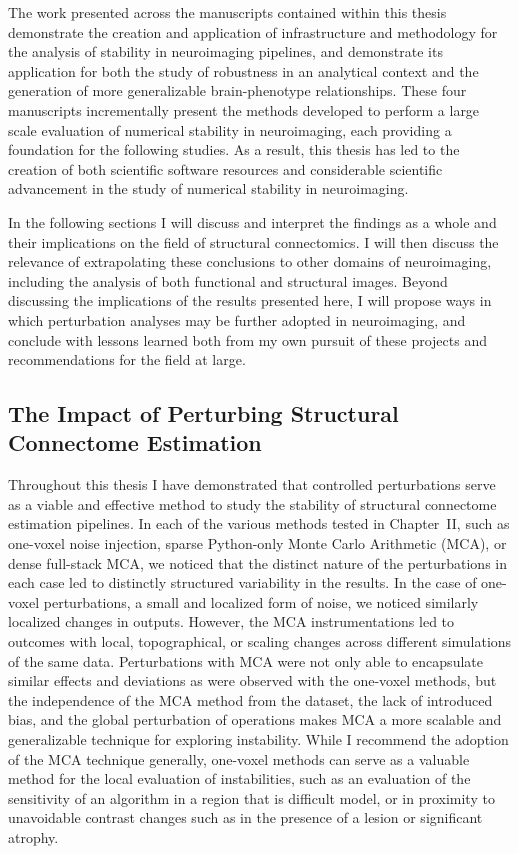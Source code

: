 The work presented across the manuscripts contained within this thesis demonstrate the creation and application of
infrastructure and methodology for the analysis of stability in neuroimaging pipelines, and demonstrate its
application for both the study of robustness in an analytical context and the generation of more generalizable
brain-phenotype relationships. These four manuscripts incrementally present the methods developed to perform a
large scale evaluation of numerical stability in neuroimaging, each providing a foundation for the following
studies. As a result, this thesis has led to the creation of both scientific software resources and considerable
scientific advancement in the study of numerical stability in neuroimaging.

In the following sections I will discuss and interpret the findings as a whole and their implications on the field
of structural connectomics. I will then discuss the relevance of extrapolating these conclusions to other domains
of neuroimaging, including the analysis of both functional and structural images. Beyond discussing the
implications of the results presented here, I will propose ways in which perturbation analyses may be further
adopted in neuroimaging, and conclude with lessons learned both from my own pursuit of these projects and
recommendations for the field at large.

\subsection{The Impact of Perturbing Structural Connectome Estimation}

Throughout this thesis I have demonstrated that controlled perturbations serve as a viable and effective method
to study the stability of structural connectome estimation pipelines. In each of the various methods tested in
Chapter~II, such as one-voxel noise injection, sparse Python-only Monte Carlo Arithmetic (MCA), or dense full-stack
MCA, we noticed that the distinct nature of the perturbations in each case led to distinctly structured variability
in the results. In the case of one-voxel perturbations, a small and localized form of noise, we noticed similarly
localized changes in outputs. However, the MCA instrumentations led to outcomes with local, topographical, or scaling
changes across different simulations of the same data. Perturbations with MCA were not only able to encapsulate
similar effects and deviations as were observed with the one-voxel methods, but the independence of the MCA method
from the dataset, the lack of introduced bias, and the global perturbation of operations makes MCA a more scalable
and generalizable technique for exploring instability. While I recommend the adoption of the MCA technique generally,
one-voxel methods can serve as a valuable method for the local evaluation of instabilities, such as an evaluation of
the sensitivity of an algorithm in a region that is difficult model, or in proximity to unavoidable contrast changes
such as in the presence of a lesion or significant atrophy.

